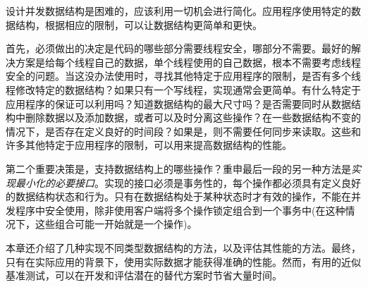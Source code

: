 设计并发数据结构是困难的，应该利用一切机会进行简化。应用程序使用特定的数据结构，根据相应的限制，可以让数据结构更简单和更快。 

首先，必须做出的决定是代码的哪些部分需要线程安全，哪部分不需要。最好的解决方案是给每个线程自己的数据，单个线程使用的自己数据，根本不需要考虑线程安全的问题。当这没办法使用时，寻找其他特定于应用程序的限制，是否有多个线程修改特定的数据结构？如果只有一个写线程，实现通常会更简单。有什么特定于应用程序的保证可以利用吗？知道数据结构的最大尺寸吗？是否需要同时从数据结构中删除数据以及添加数据，或者可以及时分离这些操作？在一些数据结构不变的情况下，是否存在定义良好的时间段？如果是，则不需要任何同步来读取。这些和许多其他特定于应用程序的限制，可以用来提高数据结构的性能。 

第二个重要决策是，支持数据结构上的哪些操作？重申最后一段的另一种方法是\textit{实现最小化的必要接口}。实现的接口必须是事务性的，每个操作都必须具有定义良好的数据结构状态和行为。只有在数据结构处于某种状态时才有效的操作，不能在并发程序中安全使用，除非使用客户端将多个操作锁定组合到一个事务中(在这种情况下，这些组合可能一开始就是一个操作)。

本章还介绍了几种实现不同类型数据结构的方法，以及评估其性能的方法。最终，只有在实际应用的背景下，使用实际数据才能获得准确的性能。然而，有用的近似基准测试，可以在开发和评估潜在的替代方案时节省大量时间。 